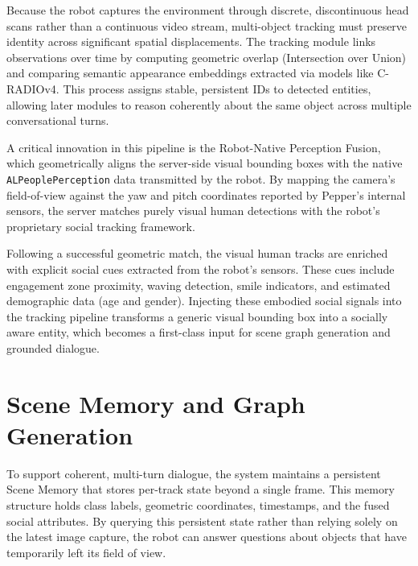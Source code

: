 Because the robot captures the environment through discrete, discontinuous head scans rather than a continuous video stream, multi-object tracking must preserve identity across significant spatial displacements. The tracking module links observations over time by computing geometric overlap (Intersection over Union) and comparing semantic appearance embeddings extracted via models like C-RADIOv4. This process assigns stable, persistent IDs to detected entities, allowing later modules to reason coherently about the same object across multiple conversational turns.

A critical innovation in this pipeline is the Robot-Native Perception Fusion, which geometrically aligns the server-side visual bounding boxes with the native \texttt{ALPeoplePerception} data transmitted by the robot. By mapping the camera's field-of-view against the yaw and pitch coordinates reported by Pepper's internal sensors, the server matches purely visual human detections with the robot's proprietary social tracking framework.

Following a successful geometric match, the visual human tracks are enriched with explicit social cues extracted from the robot's sensors. These cues include engagement zone proximity, waving detection, smile indicators, and estimated demographic data (age and gender). Injecting these embodied social signals into the tracking pipeline transforms a generic visual bounding box into a socially aware entity, which becomes a first-class input for scene graph generation and grounded dialogue.

\section{Scene Memory and Graph Generation}
\label{sec:scene_memory}

To support coherent, multi-turn dialogue, the system maintains a persistent Scene Memory that stores per-track state beyond a single frame. This memory structure holds class labels, geometric coordinates, timestamps, and the fused social attributes. By querying this persistent state rather than relying solely on the latest image capture, the robot can answer questions about objects that have temporarily left its field of view.

